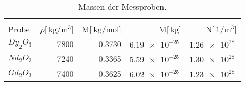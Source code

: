 
\begin{table}[!h]
\begin{center}
\begin{tabular}{|l|r|r|r|r|}
\hline
&&&&\\
Probe & $\rho$[$\SI{}{\kilo\gram\per\meter^3}$] & M[$\SI{}{\kilo\gram/\mol}$] & M[$\SI{}{\kilo\gram}$] & N[$\SI{}{1\per\meter^3}$]\\
\hline
\hline

	$Dy_2O_3$ & 7800 & 0.3730 & $\SI{6.19 e-25}{}$ & $\SI{1.26 e28}{}$\\
	$Nd_2O_3$ & 7240 & 0.3365 & $\SI{5.59 e-25}{}$ & $\SI{1.30 e28}{}$\\
	$Gd_2O_3$ & 7400 & 0.3625 & $\SI{6.02 e-25}{}$ & $\SI{1.23 e28}{}$\\

\hline
\end{tabular}
\caption{Massen der Messproben.}
\label{massen}
\end{center}
\end{table}